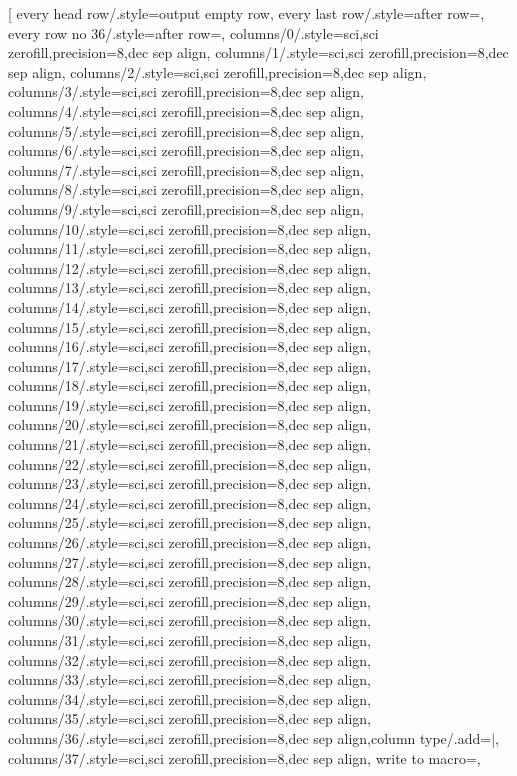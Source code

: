 \pgfplotstabletypeset[
every head row/.style={output empty row},
every last row/.style={after row={}},
every row no 36/.style={after row=\midrule},
columns/0/.style={sci,sci zerofill,precision=8,dec sep align},
columns/1/.style={sci,sci zerofill,precision=8,dec sep align},
columns/2/.style={sci,sci zerofill,precision=8,dec sep align},
columns/3/.style={sci,sci zerofill,precision=8,dec sep align},
columns/4/.style={sci,sci zerofill,precision=8,dec sep align},
columns/5/.style={sci,sci zerofill,precision=8,dec sep align},
columns/6/.style={sci,sci zerofill,precision=8,dec sep align},
columns/7/.style={sci,sci zerofill,precision=8,dec sep align},
columns/8/.style={sci,sci zerofill,precision=8,dec sep align},
columns/9/.style={sci,sci zerofill,precision=8,dec sep align},
columns/10/.style={sci,sci zerofill,precision=8,dec sep align},
columns/11/.style={sci,sci zerofill,precision=8,dec sep align},
columns/12/.style={sci,sci zerofill,precision=8,dec sep align},
columns/13/.style={sci,sci zerofill,precision=8,dec sep align},
columns/14/.style={sci,sci zerofill,precision=8,dec sep align},
columns/15/.style={sci,sci zerofill,precision=8,dec sep align},
columns/16/.style={sci,sci zerofill,precision=8,dec sep align},
columns/17/.style={sci,sci zerofill,precision=8,dec sep align},
columns/18/.style={sci,sci zerofill,precision=8,dec sep align},
columns/19/.style={sci,sci zerofill,precision=8,dec sep align},
columns/20/.style={sci,sci zerofill,precision=8,dec sep align},
columns/21/.style={sci,sci zerofill,precision=8,dec sep align},
columns/22/.style={sci,sci zerofill,precision=8,dec sep align},
columns/23/.style={sci,sci zerofill,precision=8,dec sep align},
columns/24/.style={sci,sci zerofill,precision=8,dec sep align},
columns/25/.style={sci,sci zerofill,precision=8,dec sep align},
columns/26/.style={sci,sci zerofill,precision=8,dec sep align},
columns/27/.style={sci,sci zerofill,precision=8,dec sep align},
columns/28/.style={sci,sci zerofill,precision=8,dec sep align},
columns/29/.style={sci,sci zerofill,precision=8,dec sep align},
columns/30/.style={sci,sci zerofill,precision=8,dec sep align},
columns/31/.style={sci,sci zerofill,precision=8,dec sep align},
columns/32/.style={sci,sci zerofill,precision=8,dec sep align},
columns/33/.style={sci,sci zerofill,precision=8,dec sep align},
columns/34/.style={sci,sci zerofill,precision=8,dec sep align},
columns/35/.style={sci,sci zerofill,precision=8,dec sep align},
columns/36/.style={sci,sci zerofill,precision=8,dec sep align,column type/.add={}{|}},
columns/37/.style={sci,sci zerofill,precision=8,dec sep align},
write to macro=\ABCD,
